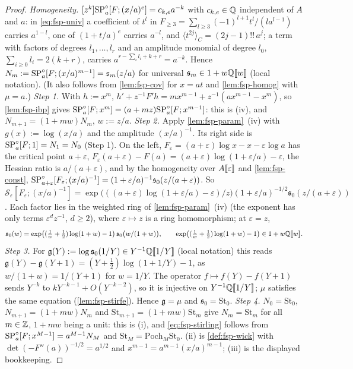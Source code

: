\begin{proof}
\emph{Homogeneity.} $[z^k]\mathrm{SP}^{\circ}_a[F;(x/a)^e]=c_{k,e}a^{-k}$ with $c_{k,e}\in\mathbb{Q}$ independent of $A$ and $a$: in \eqref{eq:fsp-univ} a coefficient of $t^l$ in $F_{\geq3}=\sum_{l\geq3}(-1)^{l+1}t^l/(la^{l-1})$ carries $a^{1-l}$, one of $(1+t/a)^e$ carries $a^{-l}$, and $\langle t^{2j}\rangle_C=(2j-1)!!\,a^j$; a term with factors of degrees $l_1,\dots,l_r$ and an amplitude monomial of degree $l_0$, $\sum_{i\geq0}l_i=2(k+r)$, carries $a^{r-\sum_il_i+k+r}=a^{-k}$. Hence $N_m:=\mathrm{SP}^{\circ}_a[F;(x/a)^{m-1}]=\mathfrak s_m(z/a)$ for universal $\mathfrak s_m\in1+w\mathbb{Q}[\![ w ]\!]$ (local notation). (It also follows from \cref{lem:fsp-cov} for $x=at$ and \cref{lem:fsp-homog} with $\mu=a$.)
\emph{Step 1.} With $h:=x^m$, $h'+z^{-1}F'h=mx^{m-1}+z^{-1}(ax^{m-1}-x^m)$, so \cref{lem:fsp-ibp} gives $\mathrm{SP}^{\circ}_a[F;x^m]=(a+mz)\mathrm{SP}^{\circ}_a[F;x^{m-1}]$: this is (iv), and $N_{m+1}=(1+mw)N_m$, $w:=z/a$.
\emph{Step 2.} Apply \cref{lem:fsp-param}~(iv) with $g(x):=\log(x/a)$ and the amplitude $(x/a)^{-1}$. Its right side is $\mathrm{SP}^{\circ}_a[F;1]=N_1=N_0$ (Step 1). On the left, $F_\varepsilon=(a+\varepsilon)\log x-x-\varepsilon\log a$ has the critical point $a+\varepsilon$, $F_\varepsilon(a+\varepsilon)-F(a)=(a+\varepsilon)\log(1+\varepsilon/a)-\varepsilon$, the Hessian ratio is $a/(a+\varepsilon)$, and by the homogeneity over $A[\![ \varepsilon ]\!]$ and \cref{lem:fsp-const}, $\mathrm{SP}^{\circ}_{a+\varepsilon}[F_\varepsilon;(x/a)^{-1}]=(1+\varepsilon/a)^{-1}\mathfrak s_0(z/(a+\varepsilon))$. So
$\mathcal S_\varepsilon[F_\varepsilon;(x/a)^{-1}]=\exp\bigl(((a+\varepsilon)\log(1+\varepsilon/a)-\varepsilon)/z\bigr)(1+\varepsilon/a)^{-1/2}\mathfrak s_0(z/(a+\varepsilon))$. Each factor lies in the weighted ring of \cref{lem:fsp-param}~(iv) (the exponent has only terms $\varepsilon^dz^{-1}$, $d\geq2$), where $\varepsilon\mapsto z$ is a ring homomorphism; at $\varepsilon=z$,
\[
\mathfrak s_0(w)=\exp\bigl((\tfrac1w+\tfrac12)\log(1+w)-1\bigr)\,\mathfrak s_0\bigl(w/(1+w)\bigr),\qquad\exp\bigl((\tfrac1w+\tfrac12)\log(1+w)-1\bigr)\in1+w\mathbb{Q}[\![ w ]\!].
\]
\emph{Step 3.} For $\mathfrak g(Y):=\log\mathfrak s_0(1/Y)\in Y^{-1}\mathbb{Q}[\![ 1/Y ]\!]$ (local notation) this reads $\mathfrak g(Y)-\mathfrak g(Y+1)=(Y+\frac12)\log(1+1/Y)-1$, as $w/(1+w)=1/(Y+1)$ for $w=1/Y$. The operator $f\mapsto f(Y)-f(Y+1)$ sends $Y^{-k}$ to $kY^{-k-1}+O(Y^{-k-2})$, so it is injective on $Y^{-1}\mathbb{Q}[\![ 1/Y ]\!]$; $\mu$ satisfies the same equation (\cref{lem:fsp-stirfe}). Hence $\mathfrak g=\mu$ and $\mathfrak s_0=\mathrm{St}_0$.
\emph{Step 4.} $N_0=\mathrm{St}_0$, $N_{m+1}=(1+mw)N_m$ and $\mathrm{St}_{m+1}=(1+mw)\mathrm{St}_m$ give $N_m=\mathrm{St}_m$ for all $m\in\mathbb{Z}$, $1+mw$ being a unit: this is (i), and \eqref{eq:fsp-stirling} follows from $\mathrm{SP}^{\circ}_a[F;x^{M-1}]=a^{M-1}N_M$ and $\mathrm{St}_M=\mathrm{Poch}_M\mathrm{St}_0$. (ii) is \cref{def:fsp-wick} with $\det(-F''(a))^{-1/2}=a^{1/2}$ and $x^{m-1}=a^{m-1}(x/a)^{m-1}$; (iii) is the displayed bookkeeping.
\end{proof}

